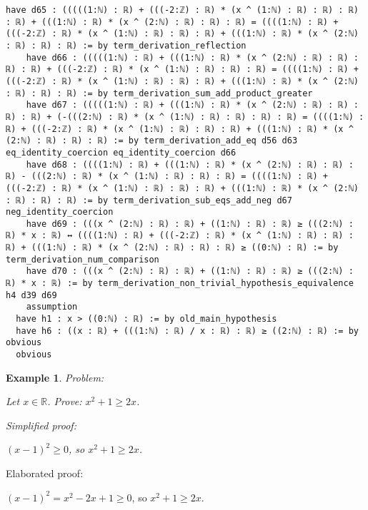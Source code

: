 \documentclass{article}
\newtheorem{example}{Example}
\begin{document}
\begin{tcolorbox}[colback=white!10, width=\linewidth]
\begin{lstlisting}[language=Lean4]
    have d65 : (((((1:ℕ) : ℝ) + (((-2:ℤ) : ℝ) * (x ^ (1:ℕ) : ℝ) : ℝ) : ℝ) : ℝ) + (((1:ℕ) : ℝ) * (x ^ (2:ℕ) : ℝ) : ℝ) : ℝ) = ((((1:ℕ) : ℝ) + (((-2:ℤ) : ℝ) * (x ^ (1:ℕ) : ℝ) : ℝ) : ℝ) + (((1:ℕ) : ℝ) * (x ^ (2:ℕ) : ℝ) : ℝ) : ℝ) := by term_derivation_reflection
    have d66 : (((((1:ℕ) : ℝ) + (((1:ℕ) : ℝ) * (x ^ (2:ℕ) : ℝ) : ℝ) : ℝ) : ℝ) + (((-2:ℤ) : ℝ) * (x ^ (1:ℕ) : ℝ) : ℝ) : ℝ) = ((((1:ℕ) : ℝ) + (((-2:ℤ) : ℝ) * (x ^ (1:ℕ) : ℝ) : ℝ) : ℝ) + (((1:ℕ) : ℝ) * (x ^ (2:ℕ) : ℝ) : ℝ) : ℝ) := by term_derivation_sum_add_product_greater
    have d67 : (((((1:ℕ) : ℝ) + (((1:ℕ) : ℝ) * (x ^ (2:ℕ) : ℝ) : ℝ) : ℝ) : ℝ) + (-(((2:ℕ) : ℝ) * (x ^ (1:ℕ) : ℝ) : ℝ) : ℝ) : ℝ) = ((((1:ℕ) : ℝ) + (((-2:ℤ) : ℝ) * (x ^ (1:ℕ) : ℝ) : ℝ) : ℝ) + (((1:ℕ) : ℝ) * (x ^ (2:ℕ) : ℝ) : ℝ) : ℝ) := by term_derivation_add_eq d56 d63 eq_identity_coercion eq_identity_coercion d66
    have d68 : ((((1:ℕ) : ℝ) + (((1:ℕ) : ℝ) * (x ^ (2:ℕ) : ℝ) : ℝ) : ℝ) - (((2:ℕ) : ℝ) * (x ^ (1:ℕ) : ℝ) : ℝ) : ℝ) = ((((1:ℕ) : ℝ) + (((-2:ℤ) : ℝ) * (x ^ (1:ℕ) : ℝ) : ℝ) : ℝ) + (((1:ℕ) : ℝ) * (x ^ (2:ℕ) : ℝ) : ℝ) : ℝ) := by term_derivation_sub_eqs_add_neg d67 neg_identity_coercion
    have d69 : (((x ^ (2:ℕ) : ℝ) : ℝ) + ((1:ℕ) : ℝ) : ℝ) ≥ (((2:ℕ) : ℝ) * x : ℝ) ↔ ((((1:ℕ) : ℝ) + (((-2:ℤ) : ℝ) * (x ^ (1:ℕ) : ℝ) : ℝ) : ℝ) + (((1:ℕ) : ℝ) * (x ^ (2:ℕ) : ℝ) : ℝ) : ℝ) ≥ ((0:ℕ) : ℝ) := by term_derivation_num_comparison
    have d70 : (((x ^ (2:ℕ) : ℝ) : ℝ) + ((1:ℕ) : ℝ) : ℝ) ≥ (((2:ℕ) : ℝ) * x : ℝ) := by term_derivation_non_trivial_hypothesis_equivalence h4 d39 d69
    assumption
  have h1 : x > ((0:ℕ) : ℝ) := by old_main_hypothesis
  have h6 : ((x : ℝ) + (((1:ℕ) : ℝ) / x : ℝ) : ℝ) ≥ ((2:ℕ) : ℝ) := by obvious
  obvious

\end{lstlisting}
\end{tcolorbox}


\begin{example}
Problem:
\begin{tcolorbox}[colback=yellow!10, width=\linewidth]
Let $x\in\mathbb{R}$. Prove: $x^2 + 1\ge 2x$.
\end{tcolorbox}

Simplified proof:
\begin{tcolorbox}[colback=blue!10, width=\linewidth]
$(x-1)^2 \ge 0$, so $x^2 + 1 \ge 2x$.
\end{tcolorbox}
\end{example}

Elaborated proof:
\begin{tcolorbox}[colback=green!10, width=\linewidth]
$(x-1)^2 = x^2 - 2x + 1 \ge 0$, so $x^2 + 1 \ge 2x$.
\end{tcolorbox}
\end{document}
